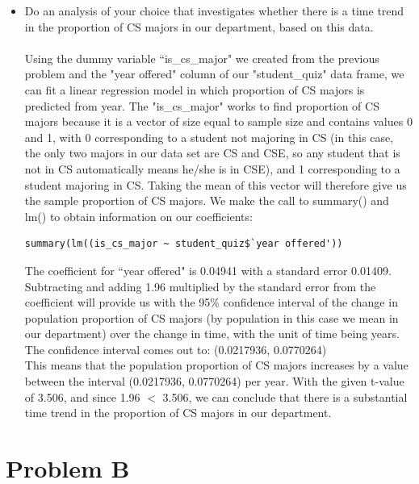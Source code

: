 \documentclass{article}
\begin{document}
\begin{itemize}
\begin{description}
                \end{description}
                


        \item Do an analysis of your choice that investigates whether there is a time trend in the proportion of CS majors in our department, based on this data.
\\\\Using the dummy variable ``is\_cs\_major" we created from the previous problem and the "year offered" column of our "student\_quiz" data frame, we can fit a linear regression model in which proportion of CS majors is predicted from year. The "is\_cs\_major" works to find proportion of CS majors because it is a vector of size equal to sample size and contains values 0 and 1, with 0 corresponding to a student not majoring in CS (in this case, the only two majors in our data set are CS and CSE, so any student that is not in CS automatically means he/she is in CSE), and 1 corresponding to a student majoring in CS. Taking the mean of this vector will therefore give us the sample proportion of CS majors. We make the call to summary() and lm() to obtain information on our coefficients: \lstset{breaklines=true}
\begin{lstlisting}[math escape]
summary(lm((is_cs_major ~ student_quiz$`year offered')) 
\end{lstlisting}
           
            
            The coefficient for ``year offered" is 0.04941 with a standard error 0.01409. Subtracting and adding 1.96 multiplied by the standard error from the coefficient will provide us with the 95\% confidence interval of the change in population proportion of CS majors (by population in this case we mean in our department) over the change in time, with the unit of time being years. \\
            The confidence interval comes out to: (0.0217936, 0.0770264) \\
            This means that the population proportion of CS majors increases by a value between the interval (0.0217936, 0.0770264) per year. With the given t-value of 3.506, and since 1.96 $<$ 3.506, we can conclude that there is a substantial time trend in the proportion of CS majors in our department.



    \end{itemize}
    
\section{Problem B}
\end{document}
